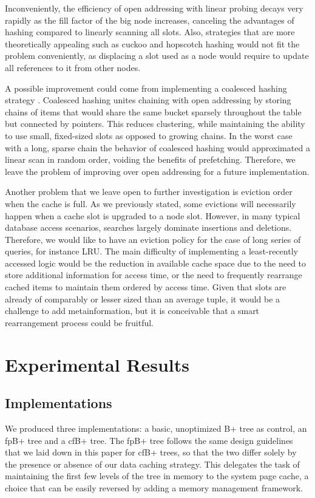 \documentclass{article}
\begin{document}
Inconveniently, the efficiency of open addressing with linear probing decays
very rapidly as the fill factor
of the big node increases, canceling the advantages of hashing compared to
linearly scanning all slots.
Also, strategies that are more theoretically appealing such as cuckoo and
hopscotch hashing
would not fit the problem conveniently, as displacing a slot used as a node
would require to update all references
to it from other nodes.

A possible improvement could come from implementing a coalesced hashing strategy
\citep{Vitter:1987}.
Coalesced hashing unites chaining with open addressing by storing chains of
items that would
share the same bucket sparsely throughout the table but connected by pointers.
This reduces clustering, while maintaining the ability to use small, fixed-sized
slots as opposed to growing chains.
In the worst case with a long, sparse chain the behavior of coalesced hashing
would approximated a linear
scan in random order, voiding the benefits of prefetching.
Therefore, we leave the problem of improving over open addressing for a future
implementation.

Another problem that we leave open to further investigation is eviction order
when the cache is full.
As we previously stated, some evictions will necessarily happen when a cache
slot is upgraded to a node slot.
However, in many typical database access scenarios, searches largely dominate
insertions and deletions.
Therefore, we would like to have an eviction policy for the case of long series
of queries, for instance LRU.
The main difficulty of implementing a least-recently accessed logic would be the
reduction
in available cache space due to the need to store additional information for
access time,
or the need to frequently rearrange cached items to maintain them ordered by
access time.
Given that slots are already of comparably or lesser sized than an average
tuple, it would be a challenge
to add metainformation, but it is conceivable that a smart rearrangement process
could be fruitful.

\section{Experimental Results}

\subsection{Implementations}
We produced three implementations: a basic, unoptimized B+ tree as control, an
fpB+ tree and a cfB+ tree.
The fpB+ tree follows the same design guidelines that we laid down in this paper
for cfB+ trees,
so that the two differ solely by the presence or absence of our data caching
strategy.
This delegates the task of maintaining the first few levels of the tree in
memory to the system page cache,
a choice that can be easily reversed by adding a memory management framework.
\end{document}
